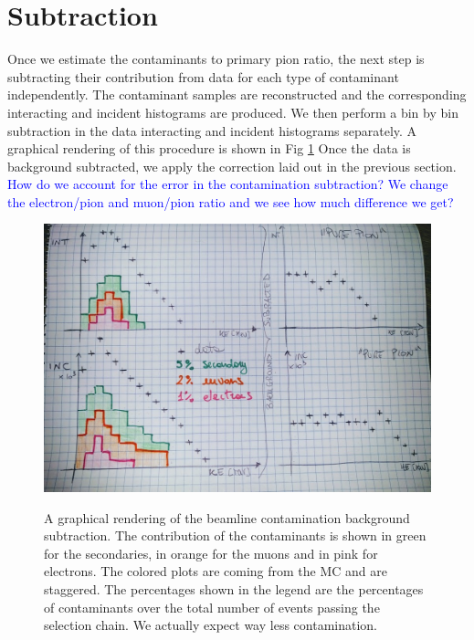 \section{Subtraction}
Once we estimate the contaminants to primary pion ratio, the next step is subtracting their contribution from data for each type of contaminant independently. The contaminant samples are reconstructed and the corresponding interacting and incident histograms are produced. We then perform a bin by bin subtraction in the data interacting and incident histograms separately. A graphical rendering of this procedure is shown in Fig \ref{fig:backgroundSubtraction}
Once the data is background subtracted, we apply the correction laid out in the previous section.
\textcolor{blue}{How do we account for the error in the contamination subtraction? We change the electron/pion and muon/pion ratio and we see how much difference we get?}

\begin{figure}
\includegraphics[width=\textwidth,height=\textheight,keepaspectratio]{Chapter-9/Images/FakePlot.jpg}
\label{fig:backgroundSubtraction}
\caption{A graphical rendering of the beamline contamination background subtraction. The contribution of the contaminants is shown in green for the secondaries, in orange for the muons and in pink for electrons. The colored plots are coming from the MC and are staggered. The percentages shown in the legend are the percentages of contaminants over the total number of events  passing the selection chain. We actually expect way less contamination.}
\end{figure}



